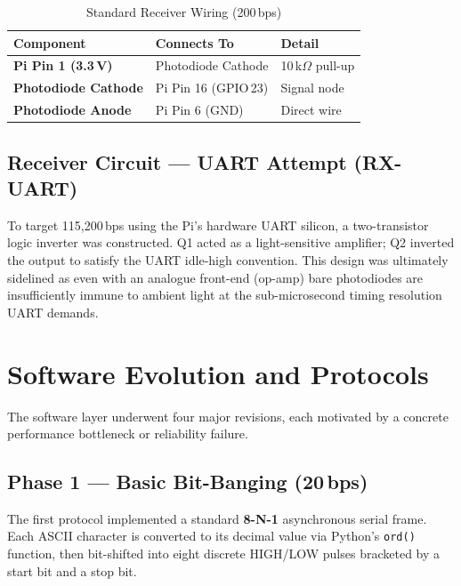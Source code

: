 \documentclass[10pt, twocolumn, a4paper]{article}
\begin{document}
\begin{table}[H]
\centering
\caption{Standard Receiver Wiring (200\,bps)}
\label{tab:rx}
\renewcommand{\arraystretch}{1.2}
\begin{tabularx}{\linewidth}{@{}>{\bfseries}l l X@{}}
\toprule
Component & Connects To & Detail \\
\midrule
Pi Pin 1 (3.3\,V)    & Photodiode Cathode & 10\,k$\Omega$ pull-up \\
Photodiode Cathode   & Pi Pin 16 (GPIO\,23) & Signal node \\
Photodiode Anode     & Pi Pin 6 (GND) & Direct wire \\
\bottomrule
\end{tabularx}
\end{table}

\subsection{Receiver Circuit — UART Attempt (RX-UART)}

To target 115,200\,bps using the Pi's hardware UART silicon, a two-transistor logic inverter was constructed. Q1 acted as a light-sensitive amplifier; Q2 inverted the output to satisfy the UART idle-high convention. This design was ultimately sidelined as even with an analogue front-end (op-amp) bare photodiodes are insufficiently immune to ambient light at the sub-microsecond timing resolution UART demands.

\section{Software Evolution and Protocols}

The software layer underwent four major revisions, each motivated by a concrete performance bottleneck or reliability failure.

\subsection{Phase 1 — Basic Bit-Banging (20\,bps)}

The first protocol implemented a standard \textbf{8-N-1} asynchronous serial frame. Each ASCII character is converted to its decimal value via Python's \texttt{ord()} function, then bit-shifted into eight discrete HIGH/LOW pulses bracketed by a start bit and a stop bit.
\end{document}
